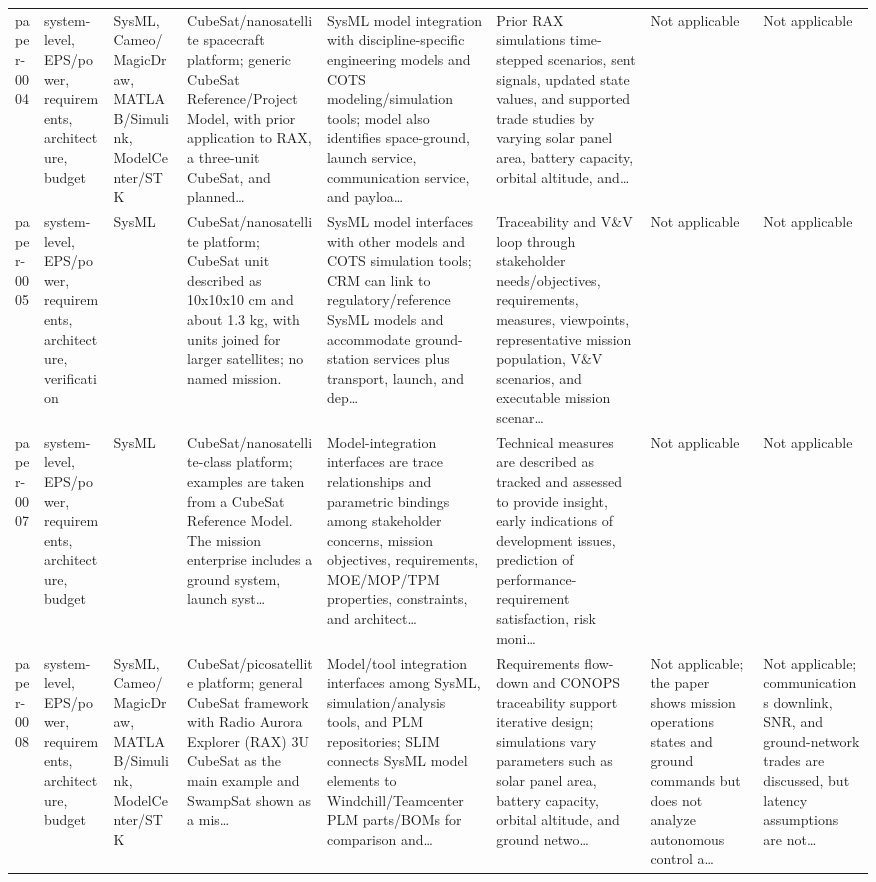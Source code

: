 \documentclass[10pt]{article}
\begin{document}
\begin{landscape}
\begin{longtable}{p{1.1cm}p{3.1cm}p{2.5cm}p{3.3cm}p{4.0cm}p{3.5cm}p{2.8cm}p{2.8cm}}
paper-0004 & system-level, EPS/power, requirements, architecture, budget & SysML, Cameo/MagicDraw, MATLAB/Simulink, ModelCenter/STK & CubeSat/nanosatellite spacecraft platform; generic CubeSat Reference/Project Model, with prior application to RAX, a three-unit CubeSat, and planned… & SysML model integration with discipline-specific engineering models and COTS modeling/simulation tools; model also identifies space-ground, launch service, communication service, and payloa… & Prior RAX simulations time-stepped scenarios, sent signals, updated state values, and supported trade studies by varying solar panel area, battery capacity, orbital altitude, and… & Not applicable & Not applicable \\
paper-0005 & system-level, EPS/power, requirements, architecture, verification & SysML & CubeSat/nanosatellite platform; CubeSat unit described as 10x10x10 cm and about 1.3 kg, with units joined for larger satellites; no named mission. & SysML model interfaces with other models and COTS simulation tools; CRM can link to regulatory/reference SysML models and accommodate ground-station services plus transport, launch, and dep… & Traceability and V\&V loop through stakeholder needs/objectives, requirements, measures, viewpoints, representative mission population, V\&V scenarios, and executable mission scenar… & Not applicable & Not applicable \\
paper-0007 & system-level, EPS/power, requirements, architecture, budget & SysML & CubeSat/nanosatellite-class platform; examples are taken from a CubeSat Reference Model. The mission enterprise includes a ground system, launch syst… & Model-integration interfaces are trace relationships and parametric bindings among stakeholder concerns, mission objectives, requirements, MOE/MOP/TPM properties, constraints, and architect… & Technical measures are described as tracked and assessed to provide insight, early indications of development issues, prediction of performance-requirement satisfaction, risk moni… & Not applicable & Not applicable \\
paper-0008 & system-level, EPS/power, requirements, architecture, budget & SysML, Cameo/MagicDraw, MATLAB/Simulink, ModelCenter/STK & CubeSat/picosatellite platform; general CubeSat framework with Radio Aurora Explorer (RAX) 3U CubeSat as the main example and SwampSat shown as a mis… & Model/tool integration interfaces among SysML, simulation/analysis tools, and PLM repositories; SLIM connects SysML model elements to Windchill/Teamcenter PLM parts/BOMs for comparison and… & Requirements flow-down and CONOPS traceability support iterative design; simulations vary parameters such as solar panel area, battery capacity, orbital altitude, and ground netwo… & Not applicable; the paper shows mission operations states and ground commands but does not analyze autonomous control a… & Not applicable; communications downlink, SNR, and ground-network trades are discussed, but latency assumptions are not… \\

\end{longtable}
\end{landscape}
\end{document}
